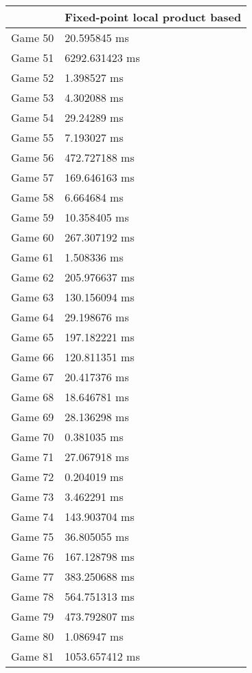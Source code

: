 \begin{multicols}{2}
\begin{tabular}{|l|l|}
\end{tabular}\\
\begin{tabular}{|l|l|}
	\hline
	& Fixed-point local product based \\ \hline
	Game 50 & 20.595845 ms \\ \hline
	Game 51 & 6292.631423 ms \\ \hline
	Game 52 & 1.398527 ms \\ \hline
	Game 53 & 4.302088 ms \\ \hline
	Game 54 & 29.24289 ms \\ \hline
	Game 55 & 7.193027 ms \\ \hline
	Game 56 & 472.727188 ms \\ \hline
	Game 57 & 169.646163 ms \\ \hline
	Game 58 & 6.664684 ms \\ \hline
	Game 59 & 10.358405 ms \\ \hline
	Game 60 & 267.307192 ms \\ \hline
	Game 61 & 1.508336 ms \\ \hline
	Game 62 & 205.976637 ms \\ \hline
	Game 63 & 130.156094 ms \\ \hline
	Game 64 & 29.198676 ms \\ \hline
	Game 65 & 197.182221 ms \\ \hline
	Game 66 & 120.811351 ms \\ \hline
	Game 67 & 20.417376 ms \\ \hline
	Game 68 & 18.646781 ms \\ \hline
	Game 69 & 28.136298 ms \\ \hline
	Game 70 & 0.381035 ms \\ \hline
	Game 71 & 27.067918 ms \\ \hline
	Game 72 & 0.204019 ms \\ \hline
	Game 73 & 3.462291 ms \\ \hline
	Game 74 & 143.903704 ms \\ \hline
	Game 75 & 36.805055 ms \\ \hline
	Game 76 & 167.128798 ms \\ \hline
	Game 77 & 383.250688 ms \\ \hline
	Game 78 & 564.751313 ms \\ \hline
	Game 79 & 473.792807 ms \\ \hline
	Game 80 & 1.086947 ms \\ \hline
	Game 81 & 1053.657412 ms \\ \hline

\end{tabular}
\end{multicols}
